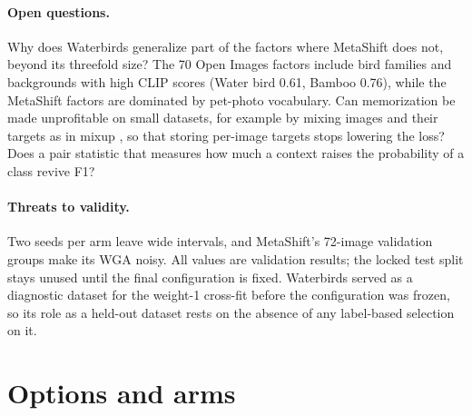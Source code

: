 \documentclass{article}
\begin{document}
\paragraph{Open questions.}
Why does Waterbirds generalize part of the factors where MetaShift does not, beyond its threefold size?
The 70 Open Images factors include bird families and backgrounds with high CLIP scores (Water bird 0.61,
Bamboo 0.76), while the MetaShift factors are dominated by pet-photo vocabulary. Can memorization be
made unprofitable on small datasets, for example by mixing images and their targets as in mixup
\citep{zhang2018mixup}, so that storing per-image targets stops lowering the loss? Does a pair statistic
that measures how much a context raises the probability of a class revive F1?

\paragraph{Threats to validity.}
Two seeds per arm leave wide intervals, and MetaShift's 72-image validation groups make its WGA noisy.
All values are validation results; the locked test split stays unused until the final configuration is
fixed. Waterbirds served as a diagnostic dataset for the weight-1 cross-fit before the configuration was
frozen, so its role as a held-out dataset rests on the absence of any label-based selection on it.

\appendix
\section{Options and arms}
\label{app:options}
\end{document}
